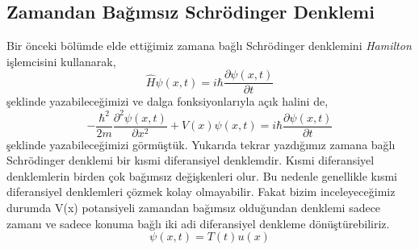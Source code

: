 \documentclass[a4paper,12pt, twoside]{article}
\begin{document}
\subsection{Zamandan Bağımsız Schrödinger Denklemi}
Bir önceki bölümde elde ettiğimiz zamana bağlı Schrödinger denklemini \emph{Hamilton} işlemcisini kullanarak,
\begin{equation}
\hat H \psi ( x , t ) = i \hbar \frac { \partial \psi ( x , t ) } { \partial t }
\label{eq:time_depended_schrodinger_eq_op_form}
\end{equation}
şeklinde yazabileceğimizi ve dalga fonksiyonlarıyla açık halini de, 
\begin{equation}
- \frac { \hbar ^ { 2 } } { 2 m } \frac { \partial ^ { 2 } \psi ( x , t ) } { \partial x ^ { 2 } } + V ( x ) \psi ( x , t ) = i \hbar \frac { \partial \psi ( x , t ) } { \partial t }
\label{eq:time_depended_schrodinger_eq}
\end{equation}
şeklinde yazabileceğimizi görmüştük.  Yukarıda tekrar yazdığımız zamana bağlı Schrödinger denklemi  bir kısmi diferansiyel denklemdir.  Kısmi diferansiyel denklemlerin birden çok bağımsız değişkenleri olur.   Bu nedenle genellikle  kısmi diferansiyel denklemleri çözmek kolay olmayabilir.  Fakat bizim inceleyeceğimiz durumda V(x)  potansiyeli zamandan bağımsız olduğundan denklemi sadece zamanı ve sadece konuma bağlı iki adi diferansiyel denkleme    dönüştürebiliriz. 
\begin{equation}
\psi ( x , t ) = T ( t ) u ( x )
\label{eq:separation_of_wave_func}
\end{equation}
\end{document}
